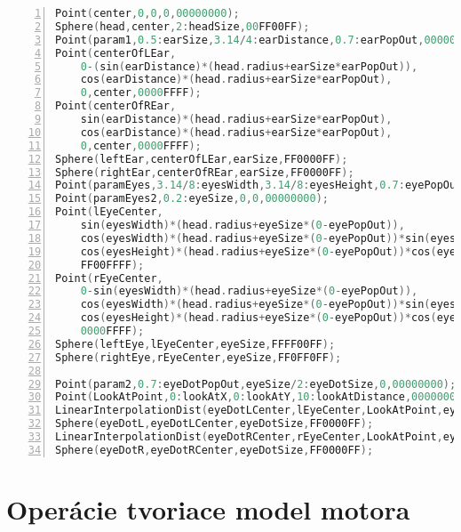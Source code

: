 \begin{lstlisting}[language=C,frame=tb,numbers=left]
Point(center,0,0,0,00000000);
Sphere(head,center,2:headSize,00FF00FF);
Point(param1,0.5:earSize,3.14/4:earDistance,0.7:earPopOut,00000000);
Point(centerOfLEar,
	0-(sin(earDistance)*(head.radius+earSize*earPopOut)),
	cos(earDistance)*(head.radius+earSize*earPopOut),
	0,center,0000FFFF);
Point(centerOfREar,
	sin(earDistance)*(head.radius+earSize*earPopOut),
	cos(earDistance)*(head.radius+earSize*earPopOut),
	0,center,0000FFFF);
Sphere(leftEar,centerOfLEar,earSize,FF0000FF);
Sphere(rightEar,centerOfREar,earSize,FF0000FF);
Point(paramEyes,3.14/8:eyesWidth,3.14/8:eyesHeight,0.7:eyePopOut,00000000);
Point(paramEyes2,0.2:eyeSize,0,0,00000000);
Point(lEyeCenter,
	sin(eyesWidth)*(head.radius+eyeSize*(0-eyePopOut)),
	cos(eyesWidth)*(head.radius+eyeSize*(0-eyePopOut))*sin(eyesHeight),
	cos(eyesHeight)*(head.radius+eyeSize*(0-eyePopOut))*cos(eyesWidth),
	FF00FFFF);
Point(rEyeCenter,
	0-sin(eyesWidth)*(head.radius+eyeSize*(0-eyePopOut)),
	cos(eyesWidth)*(head.radius+eyeSize*(0-eyePopOut))*sin(eyesHeight),
	cos(eyesHeight)*(head.radius+eyeSize*(0-eyePopOut))*cos(eyesWidth),
	0000FFFF);
Sphere(leftEye,lEyeCenter,eyeSize,FFFF00FF);
Sphere(rightEye,rEyeCenter,eyeSize,FF0FF0FF);

Point(param2,0.7:eyeDotPopOut,eyeSize/2:eyeDotSize,0,00000000);
Point(LookAtPoint,0:lookAtX,0:lookAtY,10:lookAtDistance,00000000);
LinearInterpolationDist(eyeDotLCenter,lEyeCenter,LookAtPoint,eyeSize-eyeDotSize*eyeDotPopOut,00000000);
Sphere(eyeDotL,eyeDotLCenter,eyeDotSize,FF0000FF);
LinearInterpolationDist(eyeDotRCenter,rEyeCenter,LookAtPoint,eyeSize-eyeDotSize*eyeDotPopOut,00000000);
Sphere(eyeDotR,eyeDotRCenter,eyeDotSize,FF0000FF);
\end{lstlisting}{}




\chapter{Operácie tvoriace model motora}
\label{priloha:motor}

